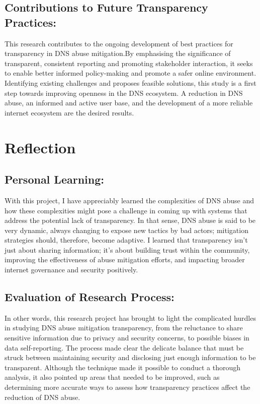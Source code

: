 \subsection{Contributions to Future Transparency Practices:}

This research contributes to the ongoing development of best practices for transparency in DNS abuse mitigation.By emphasising the significance of transparent, consistent reporting and promoting stakeholder interaction, it seeks to enable better informed policy-making and promote a safer online environment. Identifying existing challenges and proposes feasible solutions, this study is a first step towards improving openness in the DNS ecosystem. A reduction in DNS abuse, an informed and active user base, and the development of a more reliable internet ecosystem are the desired results.


\section{Reflection}
\subsection{Personal Learning: } 

With this project, I have appreciably learned the complexities of DNS abuse  and how these complexities might pose a challenge in coming up with systems that address the potential lack of transparency. In that sense, DNS abuse is said to be very dynamic, always changing to expose new tactics by bad actors; mitigation strategies should, therefore, become adaptive.  I learned that transparency isn't just about sharing information; it's about building trust within the community, improving the effectiveness of abuse mitigation efforts, and impacting broader internet governance and security positively.

\subsection{Evaluation of Research Process:  }

In other words, this research project has brought to light the complicated hurdles in studying DNS abuse mitigation transparency, from the reluctance to share sensitive information due to privacy and security concerns, to possible biases in data self-reporting. The process made clear the delicate balance that must be struck between maintaining security and disclosing just enough information to be transparent. Although the technique made it possible to conduct a thorough analysis, it also pointed up areas that needed to be improved, such as determining more accurate ways to assess how transparency practices affect the reduction of DNS abuse.



